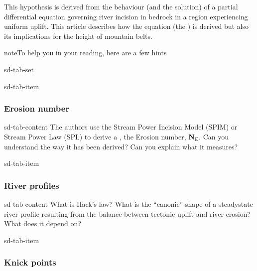 \documentclass[letterpaper,10pt,english]{jupyterBook}
\let\sphinxpxdimen\pdfpxdimen\else\newdimen\sphinxpxdimen
\begin{document}
\begin{figure}[htbp]
\centering

\noindent\sphinxincludegraphics[height=800\sphinxpxdimen]{{whipple-tucker-page}.png}
\end{figure}

\sphinxAtStartPar
This hypothesis is derived from the behaviour (and the solution) of a partial differential equation governing river incision in bedrock in a region experiencing uniform uplift. This article describes how the equation (the {\hyperref[\detokenize{spl:spl-section}]{}}) is derived but also its implications for the height of mountain belts.

\begin{sphinxadmonition}{note}{To help you in your reading, here are a few hints}

\begin{sphinxuseclass}{sd-tab-set}
\begin{sphinxuseclass}{sd-tab-item}\subsubsection*{Erosion number}

\begin{sphinxuseclass}{sd-tab-content}
\sphinxAtStartPar
The authors use the Stream Power Incision Model (SPIM) \sphinxhyphen{} or Stream Power Law (SPL) \sphinxhyphen{} to derive a {\hyperref[\detokenize{dimension:dimension-section}]{}}, the Erosion number, \(\mathbf{N_E}\). Can you understand the way it has been derived? Can you explain what it measures?

\end{sphinxuseclass}
\end{sphinxuseclass}
\begin{sphinxuseclass}{sd-tab-item}\subsubsection*{River profiles}

\begin{sphinxuseclass}{sd-tab-content}
\sphinxAtStartPar
What is Hack’s law? What is the “canonic” shape of a steady\sphinxhyphen{}state river profile resulting from the balance between tectonic uplift and river erosion? What does it depend on?

\end{sphinxuseclass}
\end{sphinxuseclass}
\begin{sphinxuseclass}{sd-tab-item}\subsubsection*{Knick points}


\end{sphinxuseclass}
\end{sphinxuseclass}
\end{sphinxadmonition}
\end{document}

